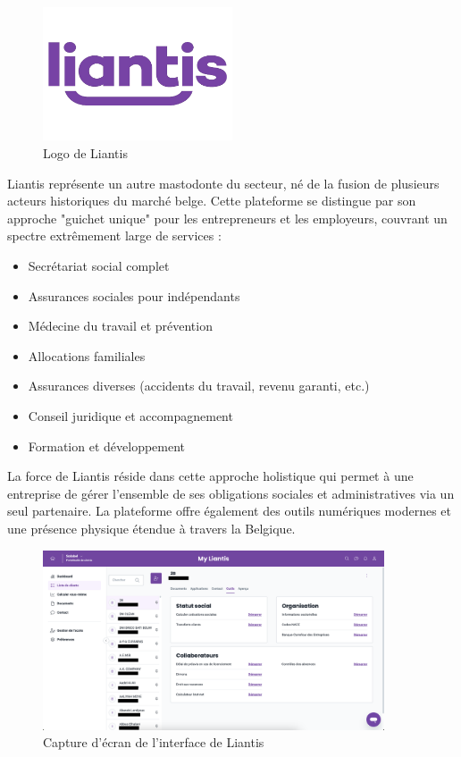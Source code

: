 \begin{figure}[H]
    \centering
    \includegraphics[width=0.5\textwidth]{liantisLogo.png}
    \caption{Logo de Liantis \cite{liantis}}
    \label{fig:liantisLogo}
\end{figure}

\noindent Liantis représente un autre mastodonte du secteur, né de la fusion de plusieurs acteurs historiques du marché belge. Cette plateforme se distingue par son approche "guichet unique" pour les entrepreneurs et les employeurs, couvrant un spectre extrêmement large de services :

\begin{itemize}[leftmargin=*,label=\textcolor{darkgray}{$\bullet$},itemsep=0.3em]
  \item Secrétariat social complet
  \item Assurances sociales pour indépendants
  \item Médecine du travail et prévention
  \item Allocations familiales
  \item Assurances diverses (accidents du travail, revenu garanti, etc.)
  \item Conseil juridique et accompagnement
  \item Formation et développement
\end{itemize}

\vspace{0.5cm}

\noindent La force de Liantis réside dans cette approche holistique qui permet à une entreprise de gérer l'ensemble de ses obligations sociales et administratives via un seul partenaire. La plateforme offre également des outils numériques modernes et une présence physique étendue à travers la Belgique.

\begin{figure}[H]
    \centering
    \includegraphics[width=0.9\textwidth]{liantisScreenshot.png}
    \caption{Capture d'écran de l'interface de Liantis \cite{liantis}}
    \label{fig:liantisScreenshot}
\end{figure}

